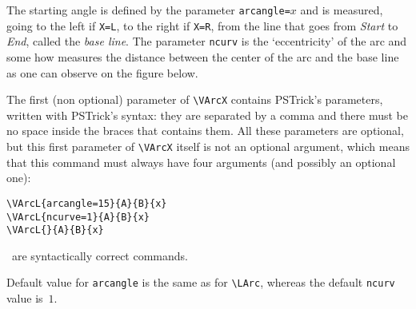 \documentclass[11pt,twoside]{article}
\newcommand{\noi}{\noindent}
\begin{document}
\noi
The starting angle is defined by the parameter \verb+arcangle=+$x$
and is measured, going to the left if 
\texttt{X=L}, to the right if \texttt{X=R}, from the line that goes 
from \textsl{Start} to \textsl{End}, called the \emph{base line}.
The parameter \verb+ncurv+ is the `eccentricity' of the arc and some 
how measures the distance between the center of the arc and the base 
line as one can observe on the figure below.

The first (non optional) parameter of \verb+\VArcX+ contains 
PSTrick's parameters, written with PSTrick's syntax: they are 
separated by a comma and there must be no space inside the braces 
that contains them.  
All these parameters are optional, but this first parameter of 
\verb+\VArcX+ itself is not an optional argument, which 
means that this command must always have
four arguments (and possibly an optional one): 

\begin{minipage}[c]{6cm}
\verb+\VArcL{arcangle=15}{A}{B}{x}+\\
\verb+\VArcL{ncurve=1}{A}{B}{x}+\\
\verb+\VArcL{}{A}{B}{x}+
\end{minipage}
\ are syntactically correct commands.

\noi 
Default value for \verb+arcangle+
is the same as for \verb+\LArc+, whereas the default \verb+ncurv+
value is~$1$. 
\end{document}
